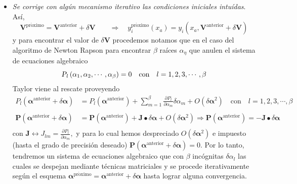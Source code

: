 \documentclass[spanish,titlepage,11pt]{article}
\begin{document}
\begin{itemize}
\item \textit{Se corrige con alg\'{u}n mecanismo iterativo las condiciones
iniciales intu\'{i}das}. As\'{i},
\[
\mathbf{V}^{\mathrm{pr\acute{o}ximo}}=\mathbf{V}^{\mathrm{anterior}}%
+\delta\mathbf{V\qquad\Rightarrow\quad}y_{i}^{\mathrm{pr\acute{o}ximo}}%
(x_{a})=y_{i}\left(  x_{a},\mathbf{V}^{\mathrm{anterior}}+\delta
\mathbf{V}\right)
\]
y para encontrar el valor de $\delta\mathbf{V}$ procedemos notamos que en el
caso del algoritmo de Newton Rapson para encontrar $\beta$ ra\'{i}ces
$\alpha_{\eta}$ que anulen el sistema de ecuaciones algebraico
\[
\textsl{P}_{l}\left(  \alpha_{1},\alpha_{2},\cdots,\alpha_{\beta}\right)
=0\quad\mathrm{con\quad}l=1,2,3,\cdots,\beta
\]
Taylor viene al rescate proveyendo
\begin{align*}
P_{l}\left(  \mathbf{\alpha}^{\mathrm{anterior}}+\delta\mathbf{\alpha
}\right)   &  =P_{l}\left(  \mathbf{\alpha}^{\mathrm{anterior}}\right)
+\sum_{m=1}^{\beta}\frac{\partial P_{l}}{\partial\alpha_{m}}\delta\alpha
_{m}+O\left(  \delta\mathbf{\alpha}^{2}\right)  \quad\mathrm{con\quad
}l=1,2,3,\cdots,\beta\\
& \\
\mathbf{P}\left(  \mathbf{\alpha}^{\mathrm{anterior}}+\delta\mathbf{\alpha
}\right)   &  =\mathbf{P}\left(  \mathbf{\alpha}^{\mathrm{anterior}}\right)
+\mathbf{J\bullet}\delta\mathbf{\alpha}+O\left(  \delta\mathbf{\alpha}%
^{2}\right)  \Rightarrow\mathbf{P}\left(  \mathbf{\alpha}^{\mathrm{anterior}%
}\right)  =-\mathbf{J\bullet}\delta\mathbf{\alpha}\\
&
\end{align*}
con $\mathbf{J}\longleftrightarrow J_{lm}=\frac{\partial P_{l}}{\partial
\alpha_{m}},$ y para lo cual hemos despreciado $O\left(  \delta\mathbf{\alpha
}^{2}\right)  $ e impuesto (hasta el grado de precisi\'{o}n deseado)
$\mathbf{P}\left(  \mathbf{\alpha}^{\mathrm{anterior}}+\delta\mathbf{\alpha
}\right)  =0$. Por lo tanto, tendremos un sistema de ecuaciones algebraico que
con $\beta$ inc\'{o}gnitas $\delta\alpha_{l}$ las cuales se despejan mediante
t\'{e}cnicas matriciales y se procede iterativamente seg\'{u}n el esquema
$\mathbf{\alpha}^{\mathrm{pr\acute{o}ximo}}=\mathbf{\alpha}^{\mathrm{anterior}%
}+\delta\mathbf{\alpha}$ hasta lograr alguna convergencia.


\end{itemize}
\end{document}
